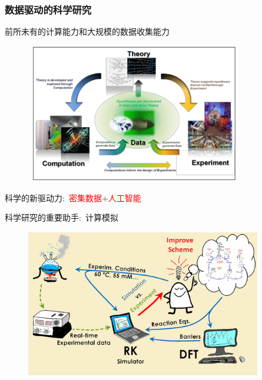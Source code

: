 \frame
{
	\frametitle{数据驱动的科学研究}
前所未有的计算能力和大规模的数据收集能力%
\begin{figure}[h!]
\centering
\includegraphics[height=2.40in,width=3.75in]{Figures/Four_Model_1.png}
\label{Four_Model_1}
\end{figure}
科学的新驱动力:~\textcolor{red}{密集数据}+\textcolor{red}{人工智能}\\
}

\begin{frame}{科学研究的重要助手:~计算模拟}
\begin{figure}[h!]
\vspace*{-0.18in}
\centering
\includegraphics[height=2.55in,width=4.05in]{Figures/Schematic_Material-Design.png}
\label{Schematic_Material-Design}
\end{figure}
\end{frame}

